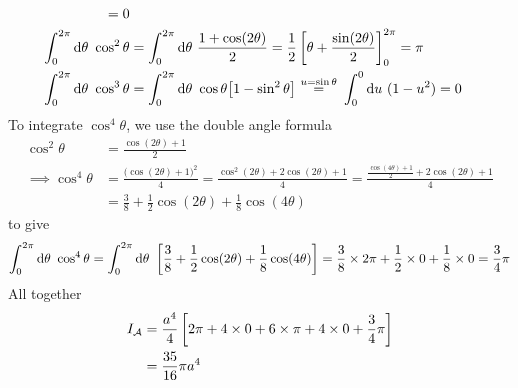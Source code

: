 \begin{eg}[Cardioid]
\begin{align*}
     =0 \\
\int_0^{2\pi}\dee{\theta}\ \cos^2\theta
     &= \int_0^{2\pi}\dee{\theta}\ \frac{1+\cos(2\theta)}{2}
     = \frac{1}{2}\left[\theta+\frac{\sin(2\theta)}{2}\right]_0^{2\pi}
     =\pi \\
\int_0^{2\pi}\dee{\theta}\ \cos^3\theta
     &= \int_0^{2\pi}\dee{\theta}\ \cos\theta\big[1-\sin^2\theta\big]
      \eqover{u=\sin\theta} \int_0^0\dee{u}\ (1-u^2)
     =0  
\end{align*}
To integrate $\cos^4\theta$, we use the double angle formula
\begin{align*}
\cos^2\theta &=\frac{\cos(2\theta)+1}{2} \\
\implies \cos^4\theta &= \frac{\big(\cos(2\theta)+1\big)^2}{4}
    =\frac{\cos^2(2\theta)+2\cos(2\theta)+1}{4}
    =\frac{\frac{\cos(4\theta)+1}{2}+2\cos(2\theta)+1}{4} \\
   &=\frac{3}{8} +\frac{1}{2}\cos(2\theta) +\frac{1}{8}\cos(4\theta)
\end{align*}
to give
\begin{align*}
\int_0^{2\pi}\mathrm{d}\theta\ \cos^4\theta
=\int_0^{2\pi}\mathrm{d}\theta\ \left[\frac{3}{8} 
         +\frac{1}{2}\cos(2\theta) +\frac{1}{8}\cos(4\theta)\right]
=\frac{3}{8} \times 2\pi +\frac{1}{2}\times 0 +\frac{1}{8}\times 0
=\frac{3}{4}\pi
\end{align*}
All together
\begin{align*}
I_{\mathcal{A}}&= \frac{a^4}{4}\left[2\pi + 4\times 0 +6\times\pi+4\times 0
                        +\frac{3}{4}\pi\right] \\
   &=\frac{35}{16}\pi a^4
\end{align*}

\end{eg}

